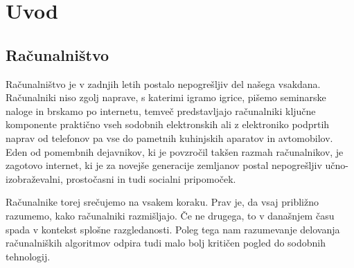 \chapter{Uvod}

\section{Računalništvo}

Računalništvo je v zadnjih letih postalo nepogrešljiv del našega vsakdana. Računalniki niso zgolj naprave, s katerimi igramo igrice, pišemo seminarske naloge in brskamo po internetu, temveč predstavljajo računalniki ključne komponente praktično vseh sodobnih elektronskih ali z elektroniko podprtih naprav od telefonov pa vse do pametnih kuhinjskih aparatov in avtomobilov. Eden od pomembnih dejavnikov, ki je povzročil takšen razmah računalnikov, je zagotovo internet, ki je za novejše generacije zemljanov postal nepogrešljiv učno-izobraževalni, prostočasni in tudi socialni pripomoček. 

Računalnike torej srečujemo na vsakem koraku.  Prav je, da vsaj približno razumemo, kako računalniki razmišljajo. Če ne drugega, to v današnjem času spada v kontekst splošne razgledanosti. Poleg tega nam razumevanje delovanja računalniških algoritmov odpira tudi malo bolj kritičen pogled do sodobnih tehnologij. 


